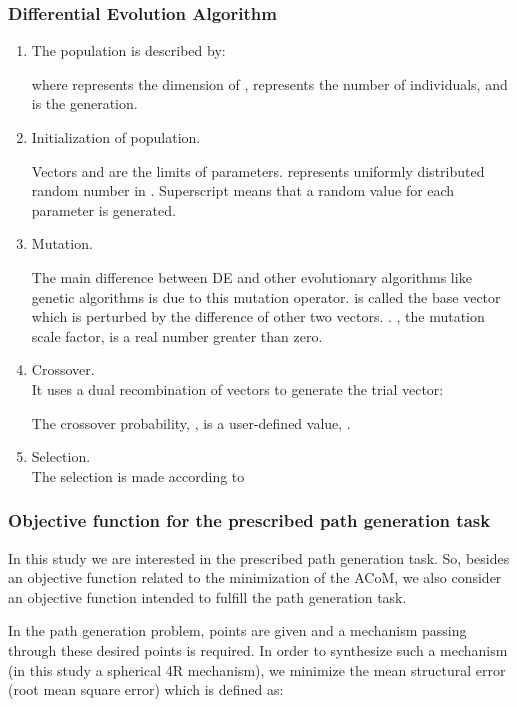 \documentclass[11pt]{article}
\begin{document}
\subsubsection{Differential Evolution Algorithm}
\begin{enumerate}
\item 
The population is described by:

where  represents the dimension of ,  represents the 
number of individuals, and  is the generation.

\item
Initialization of population.

Vectors  and  are the 
limits of parameters.
 represents uniformly distributed random number in .
Superscript  means that a random value for each parameter is 
generated.
\item
Mutation.

The main difference between DE and other evolutionary algorithms like 
genetic algorithms is due to this mutation operator. 
 is called the base vector which is perturbed by the 
difference of other two vectors.
 .
, the mutation scale factor, is a real number greater than zero.

\item
Crossover.\\
It uses a dual recombination of vectors to generate the trial vector:

The crossover probability, , is a user-defined value, 
.
\item
Selection.\\
The selection is made according to

\end{enumerate}

\subsubsection{Objective function for the prescribed path generation 
task}
In this study we are interested in the prescribed path generation task. 
So, besides an objective function related to the minimization of the 
ACoM, we also consider an objective function intended to fulfill the 
path generation task.

In the path generation problem,   points are given and a mechanism 
passing through these desired points is required. In order to synthesize 
such a mechanism (in this study a spherical 4R mechanism), we minimize 
the mean structural error (root mean square error) which  is defined as:
\end{document}
